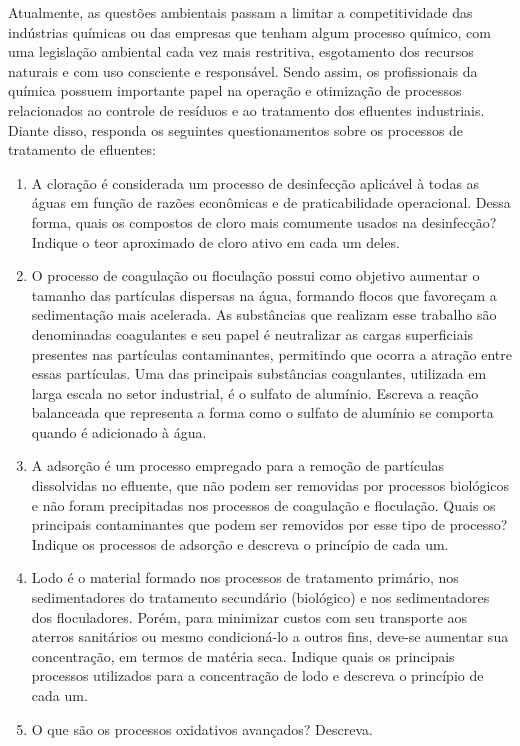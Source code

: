 Atualmente, as questões ambientais passam a limitar a competitividade das indústrias químicas ou das empresas que tenham algum processo químico, com uma legislação ambiental cada vez mais restritiva, esgotamento dos recursos naturais e com uso consciente e responsável. Sendo assim, os profissionais da química possuem importante papel na operação e otimização de processos relacionados ao controle de resíduos e ao tratamento dos efluentes industriais. Diante disso, responda os seguintes questionamentos sobre os processos de tratamento de efluentes: 

\begin{enumerate}[label = (\alph*)]
	\item A cloração é considerada um processo de desinfecção aplicável à todas as águas em função de razões econômicas e de praticabilidade operacional. Dessa forma, quais os compostos de cloro mais comumente usados na desinfecção? Indique o teor aproximado de cloro ativo em cada um deles. 
	\item O processo de coagulação ou floculação possui como objetivo aumentar o tamanho das partículas dispersas na água, formando flocos que favoreçam a sedimentação mais acelerada. As substâncias que realizam esse trabalho são denominadas coagulantes e seu papel é neutralizar as cargas superficiais presentes nas partículas contaminantes, permitindo que ocorra a atração entre essas partículas. Uma das principais substâncias coagulantes, utilizada em larga escala no setor industrial, é o sulfato de alumínio. Escreva a reação balanceada que representa a forma como o sulfato de alumínio se comporta quando é adicionado à água.
	\item A adsorção é um processo empregado para a remoção de partículas dissolvidas no efluente, que não podem ser removidas por processos biológicos e não foram precipitadas nos processos de coagulação e floculação. Quais os principais contaminantes que podem ser removidos por esse tipo de processo? Indique os processos de adsorção e descreva o princípio de cada um.
	\item Lodo é o material formado nos processos de tratamento primário, nos sedimentadores do tratamento secundário (biológico) e nos sedimentadores dos floculadores. Porém, para minimizar custos com seu transporte aos aterros sanitários ou mesmo condicioná-lo a outros fins, deve-se aumentar sua concentração, em termos de matéria seca. Indique quais os principais processos utilizados para a concentração de lodo e descreva o princípio de cada um. 
	\item O que são os processos oxidativos avançados? Descreva.
\end{enumerate}
